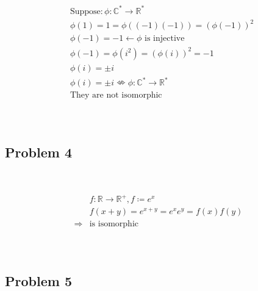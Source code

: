 \documentclass{article}
\begin{document}
\begin{equation*}
    \begin{split}
        &\text{Suppose}:\phi:\mathbb{C} ^\ast\rightarrow\mathbb{R}^\ast\\
        &\phi(1)=1=\phi((-1)(-1))=(\phi(-1))^2\\
        &\phi(-1)=-1\leftarrow\phi\text{ is injective}\\
        &\phi(-1)=\phi(i^2)=(\phi(i))^2=-1\\
        &\phi(i)=\pm i\\
        &\phi(i)=\pm i\nLeftrightarrow \phi:\mathbb{C} ^\ast\rightarrow\mathbb{R}^\ast\\
        &\text{They are not isomorphic}\\
    \end{split}
\end{equation*}

~

\subsection*{Problem 4}

~

\begin{equation*}
    \begin{split}
        &f:\mathbb{R} \rightarrow\mathbb{R} ^+,f\coloneqq e^x\\
        &f(x+y)=e^{x+y}=e^xe^y=f(x)f(y)\\
        \Rightarrow&\text{is isomorphic}\\
    \end{split}
\end{equation*}

~

\subsection*{Problem 5}

~
\end{document}
